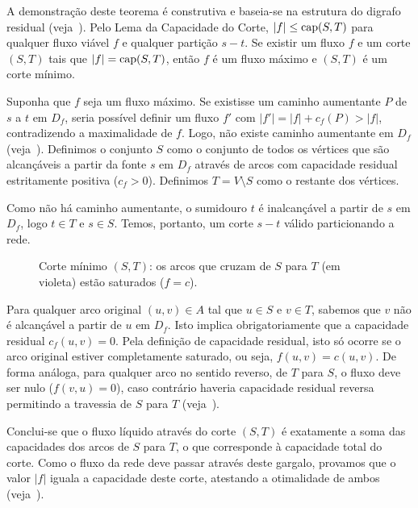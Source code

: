 \begin{demonstracao}
A demonstração deste teorema é construtiva e baseia-se na estrutura do digrafo residual (veja~\cite{ford1956maximal, cook1998combinatorial}). Pelo Lema da Capacidade do Corte, $|f| \le \operatorname{cap}(S, T)$ para qualquer fluxo viável $f$ e qualquer partição $s-t$. Se existir um fluxo $f$ e um corte $(S, T)$ tais que $|f| = \operatorname{cap}(S, T)$, então $f$ é um fluxo máximo e $(S, T)$ é um corte mínimo.

Suponha que $f$ seja um fluxo máximo. Se existisse um caminho aumentante $P$ de $s$ a $t$ em $D_f$, seria possível definir um fluxo $f'$ com $|f'| = |f| + c_f(P) > |f|$, contradizendo a maximalidade de $f$. Logo, não existe caminho aumentante em $D_f$ (veja~\cite{ahuja1993network}). Definimos o conjunto $S$ como o conjunto de todos os vértices que são alcançáveis a partir da fonte $s$ em $D_f$ através de arcos com capacidade residual estritamente positiva ($c_f > 0$). Definimos $T = V \setminus S$ como o restante dos vértices.

Como não há caminho aumentante, o sumidouro $t$ é inalcançável a partir de $s$ em $D_f$, logo $t \in T$ e $s \in S$. Temos, portanto, um corte $s-t$ válido particionando a rede.

\begin{figure}[!ht]
\centering

\caption{Corte mínimo $(S,T)$: os arcos que cruzam de $S$ para $T$ (em violeta) estão saturados ($f = c$).}
\label{fig:corte_minimo}
\end{figure}

Para qualquer arco original $(u,v) \in A$ tal que $u \in S$ e $v \in T$, sabemos que $v$ não é alcançável a partir de $u$ em $D_f$. Isto implica obrigatoriamente que a capacidade residual $c_f(u,v) = 0$. Pela definição de capacidade residual, isto só ocorre se o arco original estiver completamente saturado, ou seja, $f(u,v) = c(u,v)$. De forma análoga, para qualquer arco no sentido reverso, de $T$ para $S$, o fluxo deve ser nulo ($f(v,u) = 0$), caso contrário haveria capacidade residual reversa permitindo a travessia de $S$ para $T$ (veja~\cite{cook1998combinatorial}).

Conclui-se que o fluxo líquido através do corte $(S, T)$ é exatamente a soma das capacidades dos arcos de $S$ para $T$, o que corresponde à capacidade total do corte. Como o fluxo da rede deve passar através deste gargalo, provamos que o valor $|f|$ iguala a capacidade deste corte, atestando a otimalidade de ambos (veja~\cite{ford1956maximal}). \end{demonstracao}

